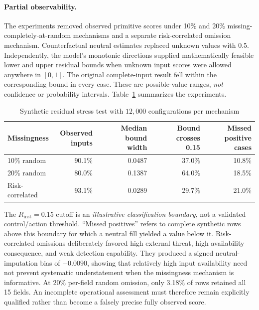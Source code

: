 \documentclass[11pt]{article}
\begin{document}
\paragraph{Partial observability.}
The experiments removed observed primitive scores under 10\% and 20\%
missing-completely-at-random mechanisms and a separate risk-correlated
omission mechanism. Counterfactual neutral estimates replaced unknown values
with $0.5$. Independently, the model's monotonic directions supplied
mathematically feasible lower and upper residual bounds when unknown input
scores were allowed anywhere in $[0,1]$. The original complete-input result
fell within the corresponding bound in every case. These are possible-value
ranges, \emph{not} confidence or probability intervals. Table~\ref{tab:stress-missing}
summarizes the experiments.

\begin{table}[htbp]
\centering
\small
\setlength{\tabcolsep}{3pt}
\caption{Synthetic residual stress test with $12{,}000$ configurations per mechanism}
\label{tab:stress-missing}
\begin{tabular}{lrrrr}
\toprule
Missingness & \shortstack{Observed\\inputs} & \shortstack{Median bound\\width} & \shortstack{Bound crosses\\0.15} & \shortstack{Missed\\positive cases}\\
\midrule
10\% random & 90.1\% & 0.0487 & 37.0\% & 10.8\%\\
20\% random & 80.0\% & 0.1387 & 64.0\% & 18.5\%\\
Risk-correlated & 93.1\% & 0.0289 & 29.7\% & 21.0\%\\
\bottomrule
\end{tabular}
\end{table}

The $R_{\mathrm{inst}}=0.15$ cutoff is an \emph{illustrative classification
boundary}, not a validated control/action threshold. ``Missed positives''
refers to complete synthetic rows above this boundary for which a neutral
fill yielded a value below it. Risk-correlated omissions deliberately
favored high external threat, high availability consequence, and weak detection
capability. They produced a signed neutral-imputation bias of $-0.0090$,
showing that relatively high input availability need not prevent systematic
understatement when the missingness mechanism is informative. At 20\%
per-field random omission, only 3.18\% of rows retained all 15 fields.
An incomplete operational assessment must therefore remain explicitly
qualified rather than become a falsely precise fully observed score.
\end{document}
